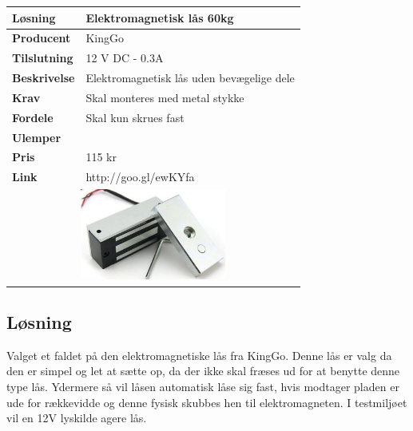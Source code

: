 \begin{table}[!htbp] \centering
	\label{tab:laas2}
\begin{tabular}{|p{6cm}|p{8cm}|}
	\hline
		\textbf{Løsning}				&Elektromagnetisk lås 60kg \\ \hline
		\textbf{Producent} 			&KingGo \\ \hline
		\textbf{Tilslutning} 		&12 V DC - 0.3A\\ \hline
		\textbf{Beskrivelse} 		&Elektromagnetisk lås uden bevægelige dele \\ \hline
		\textbf{Krav} 				&Skal monteres med metal stykke \\ \hline
		\textbf{Fordele}				&Skal kun skrues fast \\ \hline
		\textbf{Ulemper} 			& \\ \hline
		\textbf{Pris} 				&115 kr \\ \hline
		\textbf{Link} 				&http://goo.gl/ewKYfa\\ \hline	
		\multicolumn{2}{|c|}{ 
			\includegraphics[height=3cm]{billeder/magnetic.png}} \\ \hline	
\end{tabular}
\end{table}

\subsection{Løsning}

Valget et faldet på den elektromagnetiske lås fra KingGo. Denne lås er valg da den er simpel og let at sætte op, da der ikke skal fræses ud for at benytte denne type lås. Ydermere så vil låsen automatisk låse sig fast, hvis modtager pladen er ude for rækkevidde og denne fysisk skubbes hen til elektromagneten. I testmiljøet vil en 12V lyskilde agere lås.